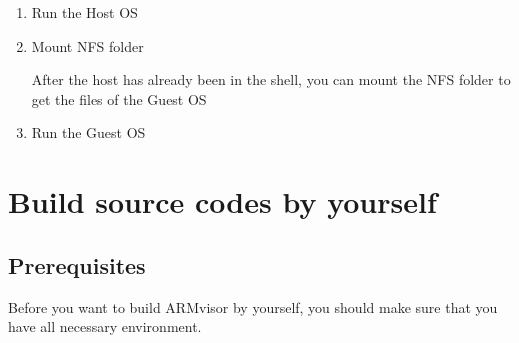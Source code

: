 \documentclass[12pt]{article}  %
\begin{document}
\begin{enumerate}

\item Run the Host OS



\item Mount NFS folder

After the host has already been in the shell, you can mount the NFS folder to get the files of the Guest OS


\item Run the Guest OS



\end{enumerate}



\section{Build source codes by yourself}

\subsection{Prerequisites}
Before you want to build ARMvisor by yourself, you should make sure that you have all necessary environment.
\end{document}
